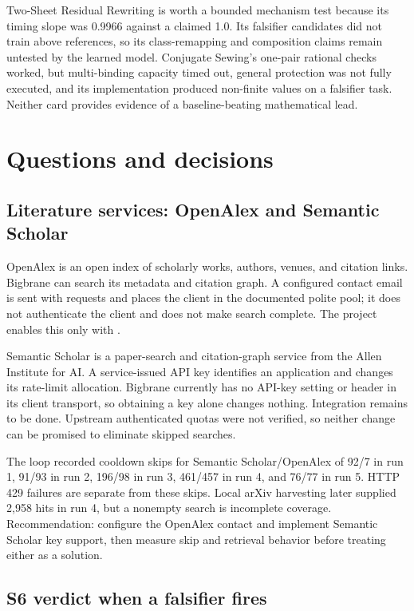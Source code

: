 Two-Sheet Residual Rewriting is worth a bounded mechanism test because its timing slope was 0.9966 against a claimed 1.0. Its falsifier candidates did not train above references, so its class-remapping and composition claims remain untested by the learned model. Conjugate Sewing's one-pair rational checks worked, but multi-binding capacity timed out, general protection was not fully executed, and its implementation produced non-finite values on a falsifier task. Neither card provides evidence of a baseline-beating mathematical lead.

\section{Questions and decisions}

\subsection{Literature services: OpenAlex and Semantic Scholar}

OpenAlex is an open index of scholarly works, authors, venues, and citation links. Bigbrane can search its metadata and citation graph. A configured contact email is sent with requests and places the client in the documented polite pool; it does not authenticate the client and does not make search complete. The project enables this only with .

Semantic Scholar is a paper-search and citation-graph service from the Allen Institute for AI. A service-issued API key identifies an application and changes its rate-limit allocation. Bigbrane currently has no API-key setting or  header in its client transport, so obtaining a key alone changes nothing. Integration remains to be done. Upstream authenticated quotas were not verified, so neither change can be promised to eliminate skipped searches.

The loop recorded cooldown skips for Semantic Scholar/OpenAlex of 92/7 in run 1, 91/93 in run 2, 196/98 in run 3, 461/457 in run 4, and 76/77 in run 5. HTTP 429 failures are separate from these skips. Local arXiv harvesting later supplied 2,958 hits in run 4, but a nonempty search is incomplete coverage. Recommendation: configure the OpenAlex contact and implement Semantic Scholar key support, then measure skip and retrieval behavior before treating either as a solution.

\subsection{S6 verdict when a falsifier fires}

